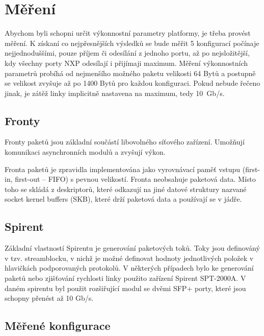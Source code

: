 \documentclass[11pt, titlepage, a4paper]{article}
\begin{document}


		\section{Měření}
		Abychom byli schopni určit výkonnostní parametry platformy, je třeba provést měření. K získaní co nejpřesnějších výsledků se bude měřit 5 konfigurací počínaje
		nejjednoduššími, pouze příjem či odesílání z jednoho portu, až po nejsložitější, kdy všechny porty NXP odesílají i přijímaji maximum.
		Měření výkonnostních parametrů probíhá od nejmenšího možného paketu velikosti 64 Bytů a postupně se velikost zvyšuje až po 1400 Bytů pro každou konfiguraci.
		Pokud nebude řečeno jinak, je zátěž linky implicitně nastavena na maximum, tedy 10~Gb/s.

		\subsection{Fronty}
		Fronty paketů jsou základní součástí libovolného síťového zařízení. Umožňují komunikaci asynchronních modulů a zvyšují výkon.

		Fronta paketů je zpravidla implementována jako vyrovnávací paměť vstupu (first-in, first-out -- FIFO) s pevnou velikostí.
		Fronta neobsahuje paketová data. Místo toho se skládá z deskriptorů, které odkazují na jiné datové struktury
		nazvané socket kernel buffers (SKB), které drží paketová data a používají se v jádře.

		\subsection{Spirent}
		Základní vlastností Spirentu je generování paketových toků. Toky jsou definováný v tzv. streamblocku, v nichž je možné
		definovat hodnoty jednotlivých položek v hlavičkách podporovaných protokolů.
		V některých případech bylo ke generování paketů nebo zjišťování rychlosti linky použito zařízení Spirent SPT-2000A.
		V daném spirentu byl použit rozšiřující modul se dvěmi SFP+ porty, které jsou schopny přenést až 10 Gb/s.

		\subsection{Měřené konfigurace}
\end{document}
